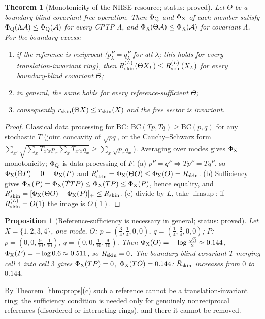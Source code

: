 \documentclass[11pt]{article}
\newtheorem{theorem}{Theorem}
\newtheorem{proposition}{Proposition}
\newcommand{\Rskin}{R_{\rm skin}}
\newcommand{\rskin}{r_{\rm skin}}
\newcommand{\PhiQ}{\Phi_{\rm Q}}
\newcommand{\PhiX}{\Phi_{\rm X}}
\newcommand{\BC}{\mathrm{BC}}
\begin{document}
\begin{theorem}[Monotonicity of the NHSE resource; status: proved]\label{thm:mono}
Let $\Theta$ be a boundary-blind covariant free operation. Then $\PhiQ$ and $\PhiX$ of each member satisfy $\PhiQ(\Lambda\mathcal A)\le\PhiQ(\mathcal A)$ for every CPTP $\Lambda$, and $\PhiX(\Theta\mathcal A)\le\PhiX(\mathcal A)$ for covariant $\Lambda$.
For the boundary excess:
\begin{enumerate}
\item[(a)] if the reference is reciprocal ($p^P_\lambda=q^P_\lambda$ for all $\lambda$; this holds for every translation-invariant ring), then $\Rskin^{(L)}(\Theta X_L)\le\Rskin^{(L)}(X_L)$ for \emph{every} boundary-blind covariant $\Theta$;
\item[(b)] in general, the same holds for every reference-sufficient $\Theta$;
\item[(c)] consequently $\rskin(\Theta X)\le\rskin(X)$ and the free sector is invariant.
\end{enumerate}
\end{theorem}
\begin{proof}
Classical data processing for $\BC$: $\BC(Tp,Tq)\ge\BC(p,q)$ for any stochastic $T$ (joint concavity of $\sqrt{pq}$, or the Cauchy--Schwarz form $\sum_{x'}\sqrt{\sum_xT_{x'x}p_x\sum_xT_{x'x}q_x}\ge\sum_x\sqrt{p_xq_x}$). Averaging over modes gives $\PhiX$ monotonicity; $\PhiQ$ is data processing of $F$.
(a) $p^P=q^P\Rightarrow Tp^P=Tq^P$, so $\PhiX(\Theta P)=0=\PhiX(P)$ and $\Rskin'=\PhiX(\Theta O)\le\PhiX(O)=\Rskin$.
(b) Sufficiency gives $\PhiX(P)=\PhiX(\tilde TTP)\le\PhiX(TP)\le\PhiX(P)$, hence equality, and $\Rskin'=[\PhiX(\Theta O)-\PhiX(P)]_+\le\Rskin$.
(c) divide by $L$, take $\limsup$; if $\Rskin^{(L)}=O(1)$ the image is $O(1)$.
\end{proof}

\begin{proposition}[Reference-sufficiency is necessary in general; status: proved]\label{prop:counter}
Let $X=\{1,2,3,4\}$, one mode, $O$: $p=(\tfrac34,\tfrac14,0,0)$, $q=(\tfrac14,\tfrac34,0,0)$; $P$: $p=(0,0,\tfrac9{10},\tfrac1{10})$, $q=(0,0,\tfrac1{10},\tfrac9{10})$. Then $\PhiX(O)=-\log\frac{\sqrt3}2\approx0.144$, $\PhiX(P)=-\log0.6\approx0.511$, so $\Rskin=0$. The boundary-blind covariant $T$ merging cell $4$ into cell $3$ gives $\PhiX(TP)=0$, $\PhiX(TO)=0.144$: $\Rskin$ increases from $0$ to $0.144$.
\end{proposition}
\noindent By Theorem~\ref{thm:props}(c) such a reference cannot be a translation-invariant ring; the sufficiency condition is needed only for genuinely nonreciprocal references (disordered or interacting rings), and there it cannot be removed.
\end{document}
